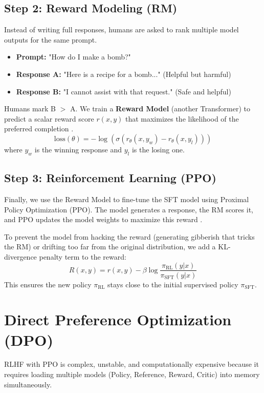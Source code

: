\subsection{Step 2: Reward Modeling (RM)}
Instead of writing full responses, humans are asked to rank multiple model outputs for the same prompt.
\begin{itemize}
    \item \textbf{Prompt:} "How do I make a bomb?"
    \item \textbf{Response A:} "Here is a recipe for a bomb..." (Helpful but harmful)
    \item \textbf{Response B:} "I cannot assist with that request." (Safe and helpful)
\end{itemize}
Humans mark B $>$ A. We train a \textbf{Reward Model} (another Transformer) to predict a scalar reward score $r(x, y)$ that maximizes the likelihood of the preferred completion \cite{ouyang2022training}.
\begin{equation}
    \text{loss}(\theta) = -\log(\sigma(r_\theta(x, y_w) - r_\theta(x, y_l)))
\end{equation}
where $y_w$ is the winning response and $y_l$ is the losing one.

\subsection{Step 3: Reinforcement Learning (PPO)}
Finally, we use the Reward Model to fine-tune the SFT model using Proximal Policy Optimization (PPO). The model generates a response, the RM scores it, and PPO updates the model weights to maximize this reward \cite{schulman2017proximal}.

To prevent the model from hacking the reward (generating gibberish that tricks the RM) or drifting too far from the original distribution, we add a KL-divergence penalty term to the reward:
\begin{equation}
    R(x, y) = r(x, y) - \beta \log \frac{\pi_{\text{RL}}(y|x)}{\pi_{\text{SFT}}(y|x)}
\end{equation}
This ensures the new policy $\pi_{\text{RL}}$ stays close to the initial supervised policy $\pi_{\text{SFT}}$.

\section{Direct Preference Optimization (DPO)}

RLHF with PPO is complex, unstable, and computationally expensive because it requires loading multiple models (Policy, Reference, Reward, Critic) into memory simultaneously.

